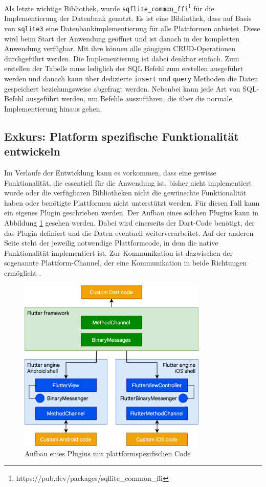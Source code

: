 Als letzte wichtige Bibliothek, wurde \verb|sqflite_common_ffi|\footnote{https://pub.dev/packages/sqflite\_common\_ffi} für die Implementierung der Datenbank genutzt. Es ist eine Bibliothek, dass auf Basis von \verb|sqlite3| eine Datenbankimplementierung für alle Plattformen anbietet.
Diese wird beim Start der Anwendung geöffnet und ist danach in der kompletten Anwendung verfügbar.
Mit ihre können alle gängigen \ac{CRUD}-Operationen durchgeführt werden. Die Implementierung ist dabei denkbar einfach.
Zum erstellen der Tabelle muss lediglich der SQL Befehl zum erstellen ausgeführt werden und danach kann über dedizierte \verb|insert| und \verb|query| Methoden die Daten gespeichert beziehungsweise abgefragt werden.
Nebenbei kann jede Art von SQL-Befehl ausgeführt werden, um Befehle auszuführen, die über die normale Implementierung hinaus gehen.


\subsection{Exkurs: Platform spezifische Funktionalität entwickeln}
Im Verlaufe der Entwicklung kann es vorkommen, dass eine gewisse Funktionalität, die essentiell für die Anwendung ist, bisher nicht implementiert wurde oder die verfügbaren Bibliotheken nicht die gewünschte Funktionalität haben oder benötigte Plattformen nicht unterstützt werden. Für diesen Fall kann ein eigenes Plugin geschrieben werden. Der Aufbau eines solchen Plugins kann in Abbildung \ref{fig:flutter_plattform_specific} gesehen werden. Dabei wird einerseits der Dart-Code benötigt, der das Plugin definiert und die Daten eventuell weiterverarbeitet. Auf der anderen Seite steht der jeweilig notwendige Plattformcode, in dem die native Funktionalität implementiert ist. Zur Kommunikation ist dazwischen der sogenannte Plattform-Channel, der eine Kommunikation in beide Richtungen ermöglicht \cite[Kapitel~12.3]{Flutter_Recipes}.

\begin{figure}[ht]
  \centering
  \includegraphics[width=9cm,keepaspectratio]{images/flutter-platform-channels.png} 
  \caption[Aufbau eines Plugins mit plattformspezifischen Code]{Aufbau eines Plugins mit plattformspezifischen Code\protect\footnotemark}
  \label{fig:flutter_plattform_specific}
\end{figure}

